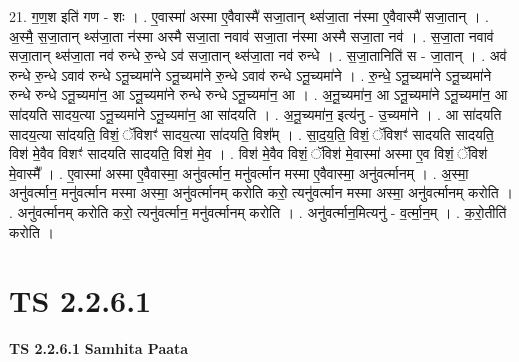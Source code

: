 \documentclass[17pt]{extarticle}
\begin{document}
21. ग॒ण॒श इति॑ गण - शः । . ए॒वास्मा॑ अस्मा ए॒वैवास्मै॑ सजा॒तान् थ्स॑जा॒ता न॑स्मा ए॒वैवास्मै॑ सजा॒तान् । . अ॒स्मै॒ स॒जा॒तान् थ्स॑जा॒ता न॑स्मा अस्मै सजा॒ता नवाव॑ सजा॒ता न॑स्मा अस्मै सजा॒ता नव॑ । . स॒जा॒ता नवाव॑ सजा॒तान् थ्स॑जा॒ता नव॑ रुन्धे रु॒न्धे ऽव॑ सजा॒तान् थ्स॑जा॒ता नव॑ रुन्धे । . स॒जा॒तानिति॑ स - जा॒तान् । . अव॑ रुन्धे रु॒न्धे ऽवाव॑ रुन्धे ऽनू॒च्यमा॑ने ऽनू॒च्यमा॑ने रु॒न्धे ऽवाव॑ रुन्धे ऽनू॒च्यमा॑ने । . रु॒न्धे॒ ऽनू॒च्यमा॑ने ऽनू॒च्यमा॑ने रुन्धे रुन्धे ऽनू॒च्यमा॑न॒ आ ऽनू॒च्यमा॑ने रुन्धे रुन्धे ऽनू॒च्यमा॑न॒ आ । . अ॒नू॒च्यमा॑न॒ आ ऽनू॒च्यमा॑ने ऽनू॒च्यमा॑न॒ आ सा॑दयति सादय॒त्या ऽनू॒च्यमा॑ने ऽनू॒च्यमा॑न॒ आ सा॑दयति । . अ॒नू॒च्यमा॑न॒ इत्य॑नु - उ॒च्यमा॑ने । . आ सा॑दयति सादय॒त्या सा॑दयति॒ विशं॒ ॅविशꣳ॑ सादय॒त्या सा॑दयति॒ विश᳚म् । . सा॒द॒य॒ति॒ विशं॒ ॅविशꣳ॑ सादयति सादयति॒ विश॑ मे॒वैव विशꣳ॑ सादयति सादयति॒ विश॑ मे॒व । . विश॑ मे॒वैव विशं॒ ॅविश॑ मे॒वास्मा॑ अस्मा ए॒व विशं॒ ॅविश॑ मे॒वास्मै᳚ । . ए॒वास्मा॑ अस्मा ए॒वैवास्मा॒ अनु॑वर्त्मान॒ मनु॑वर्त्मान मस्मा ए॒वैवास्मा॒ अनु॑वर्त्मानम् । . अ॒स्मा॒ अनु॑वर्त्मान॒ मनु॑वर्त्मान मस्मा अस्मा॒ अनु॑वर्त्मानम् करोति करो॒ त्यनु॑वर्त्मान मस्मा अस्मा॒ अनु॑वर्त्मानम् करोति । . अनु॑वर्त्मानम् करोति करो॒ त्यनु॑वर्त्मान॒ मनु॑वर्त्मानम् करोति । . अनु॑वर्त्मान॒मित्यनु॑ - व॒र्त्मा॒न॒म् । . क॒रो॒तीति॑ करोति । \newline
\pagebreak
{}

\section{ TS 2.2.6.1 }

\textbf{TS 2.2.6.1 } \newline
\textbf{Samhita Paata} \newline
\end{document}
